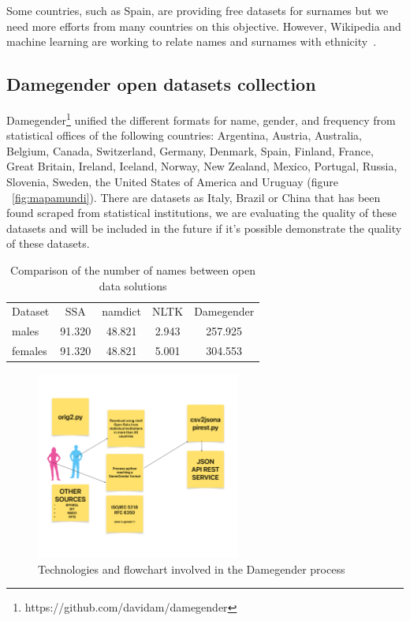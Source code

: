 \documentclass[a4paper]{article}
\begin{document}
Some countries, such as Spain, are providing free datasets for
surnames but we need more efforts from many countries on this
objective. However, Wikipedia and machine learning are working
to relate names and surnames with ethnicity~\cite{ambekar2009name}.

\subsection{Damegender open datasets collection}
\label{sec:damegender}

Damegender\footnote{https://github.com/davidam/damegender}
unified the different formats for name, gender,
and frequency from statistical offices of the following countries:
Argentina, Austria, Australia, Belgium, Canada, Switzerland, Germany,
Denmark, Spain, Finland, France, Great Britain, Ireland, Iceland,
Norway, New Zealand, Mexico, Portugal, Russia, Slovenia, Sweden,
the United States of America and Uruguay (figure ~\ref{fig:mapamundi}).
There are datasets as Italy, Brazil or China that has been found
scraped from statistical institutions, we are evaluating the quality
of these datasets and will be included in the future if it's possible
demonstrate the quality of these datasets.

\begin{table}[t]
\footnotesize
\begin{tabular}[]{lcccc}
  \hline
  Dataset & SSA & namdict & NLTK & Damegender \tabularnewline
  males & 91.320 & 48.821 & 2.943 & 257.925 \tabularnewline
  females & 91.320 & 48.821 & 5.001 & 304.553 \tabularnewline
  \hline
\end{tabular}
\caption{Comparison of the number of names between open data solutions}
\label{table:DifferentNamesMeasures}
\end{table}

\begin{figure}
  \centering
  \includegraphics[width=0.6\textwidth]{images/flowchart.pdf}
  \caption[Caption for flowchart]{Technologies and flowchart involved in the Damegender process}
  \label{fig:flowchart}
\end{figure}
\end{document}
